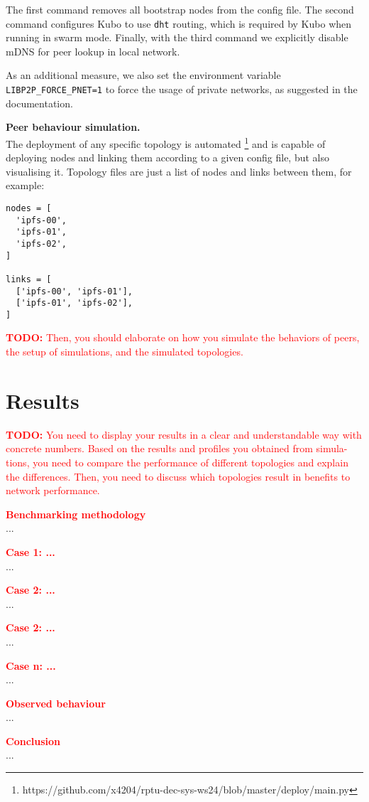 The first command removes all bootstrap nodes from the config file. The second
command configures Kubo to use \verb|dht| routing, which is required by Kubo
when running in swarm mode. Finally, with the third command we explicitly
disable mDNS for peer lookup in local network.

As an additional measure, we also set the environment variable
\verb|LIBP2P_FORCE_PNET=1| to force the usage of private networks, as suggested
in the documentation.


\textbf{Peer behaviour simulation.}\\
The deployment of any specific topology is automated
\footnote{https://github.com/x4204/rptu-dec-sys-ws24/blob/master/deploy/main.py}
and is capable of deploying nodes and linking them according to a given config
file, but also visualising it. Topology files are just a list of nodes and
links between them, for example:
\begin{lstlisting}
nodes = [
  'ipfs-00',
  'ipfs-01',
  'ipfs-02',
]

links = [
  ['ipfs-00', 'ipfs-01'],
  ['ipfs-01', 'ipfs-02'],
]
\end{lstlisting}

\textcolor{red}{
  \textbf{TODO:} Then, you should elaborate on how you simulate the behaviors
  of peers, the setup of simulations, and the simulated topologies.
}


\section{Results}

\textcolor{red}{
  \textbf{TODO:} You need to display your results in a clear and understandable
  way with concrete numbers. Based on the results and profiles you obtained
  from simula- tions, you need to compare the performance of different
  topologies and explain the differences. Then, you need to discuss which
  topologies result in benefits to network performance.
}

\textcolor{red}{\textbf{Benchmarking methodology}}\\
...

\textcolor{red}{\textbf{Case 1: ...}}\\
...

\textcolor{red}{\textbf{Case 2: ...}}\\
...

\textcolor{red}{\textbf{Case 2: ...}}\\
...

\textcolor{red}{\textbf{Case n: ...}}\\
...

\textcolor{red}{\textbf{Observed behaviour}}\\
...


\textcolor{red}{\textbf{Conclusion}}\\
...



